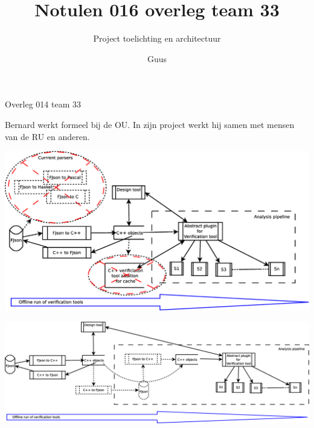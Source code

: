 \documentclass[a4paper,final]{article}
\title{Notulen 016 overleg team 33}
\author{Guus}
\begin{document}

\begin{Minutes}{Overleg 014 team 33}
\subtitle{Project toelichting en architectuur}

\maketitle%

\newcommand{\w}[1]{\textsc{#1}}

 Bernard werkt formeel bij de OU. In zijn
project werkt hij samen met mensen van de RU en anderen.


\begin{center}
	\includegraphics[width=.9\linewidth]{2014-11-29-meeting-architecture-tool-1}
	\label{fig:architecture-high-level-1}
\end{center}

\begin{center}
	\includegraphics[width=.9\linewidth]{2014-11-29-meeting-architecture-tool-2}
	\label{fig:architecture-high-level-2}
\end{center}


\end{Minutes}
\end{document}
